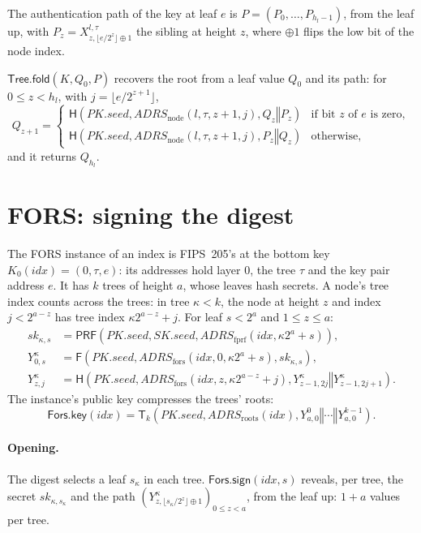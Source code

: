 \documentclass[11pt]{article}
\newcommand{\PRF}{\mathsf{PRF}}
\newcommand{\concat}{\mathbin\Vert}
\newcommand{\pkseed}{\mathit{PK.seed}}
\newcommand{\skseed}{\mathit{SK.seed}}
\newcommand{\addr}{\mathit{ADRS}}
\newcommand{\idx}{\mathit{idx}}
\newcommand{\TreeFold}{\mathsf{Tree.fold}}
\newcommand{\ForsKey}{\mathsf{Fors.key}}
\newcommand{\ForsSign}{\mathsf{Fors.sign}}
\begin{document}
The authentication path of the key at leaf $e$ is $P=(P_0,\ldots,P_{h_l-1})$, from the leaf up, with $P_z=X^{l,\tau}_{z,\lfloor e/2^z\rfloor\oplus1}$ the sibling at height $z$, where $\oplus1$ flips the low bit of the node index.

$\TreeFold(K,Q_0,P)$ recovers the root from a leaf value $Q_0$ and its path: for $0\leq z<h_l$, with $j=\lfloor e/2^{z+1}\rfloor$,
\[
  Q_{z+1}=\begin{cases}
    \mathsf H\!\left(\pkseed,\addr_{\mathrm{node}}(l,\tau,z+1,j),Q_z\concat P_z\right)
      &\text{if bit $z$ of $e$ is zero},\\[2pt]
    \mathsf H\!\left(\pkseed,\addr_{\mathrm{node}}(l,\tau,z+1,j),P_z\concat Q_z\right)
      &\text{otherwise},
  \end{cases}
\]
and it returns $Q_{h_l}$.

\section{FORS: signing the digest}
\label{sec:fts}

The FORS instance of an index is FIPS~205's at the bottom key $K_0(\idx)=(0,\tau,e)$: its addresses hold layer $0$, the tree $\tau$ and the key pair address $e$. It has $k$ trees of height $a$, whose leaves hash secrets. A node's tree index counts across the trees: in tree $\kappa<k$, the node at height $z$ and index $j<2^{a-z}$ has tree index $\kappa2^{a-z}+j$. For leaf $s<2^a$ and $1\leq z\leq a$:
\[
\begin{aligned}
  \mathit{sk}_{\kappa,s}&=\PRF\!\left(\pkseed,\skseed,\addr_{\mathrm{fprf}}(\idx,\kappa2^a+s)\right),\\
  Y^{\kappa}_{0,s}&=\mathsf F\!\left(\pkseed,\addr_{\mathrm{fors}}(\idx,0,\kappa2^a+s),\mathit{sk}_{\kappa,s}\right),\\
  Y^{\kappa}_{z,j}&=\mathsf H\!\left(\pkseed,\addr_{\mathrm{fors}}(\idx,z,\kappa2^{a-z}+j),Y^{\kappa}_{z-1,2j}\concat Y^{\kappa}_{z-1,2j+1}\right).
\end{aligned}
\]
The instance's public key compresses the trees' roots:
\[
  \ForsKey(\idx)=\mathsf T_k\!\left(\pkseed,\addr_{\mathrm{roots}}(\idx),Y^{0}_{a,0}\concat\cdots\concat Y^{k-1}_{a,0}\right).
\]

\paragraph{Opening.}
The digest selects a leaf $s_\kappa$ in each tree. $\ForsSign(\idx,s)$ reveals, per tree, the secret $\mathit{sk}_{\kappa,s_\kappa}$ and the path $(Y^{\kappa}_{z,\lfloor s_\kappa/2^z\rfloor\oplus1})_{0\leq z<a}$, from the leaf up: $1+a$ values per tree.
\end{document}
